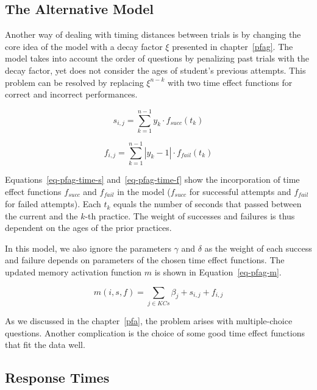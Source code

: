 \subsection{The Alternative Model}
\label{pfagt}

Another way of dealing with timing distances between trials is by changing the core idea of the model with a decay factor $\xi$ presented in chapter~\ref{pfag}. The model takes into account the order of questions by penalizing past trials with the decay factor, yet does not consider the ages of student's previous attempts. This problem can be resolved by replacing $\xi^{n-k}$ with two time effect functions for correct and incorrect performances.

\begin{equation} \label{eq-pfag-time-s}
  s_{i,j} = \sum_{k=1}^{n-1} y_k \cdot f_{\mathit{succ}}(t_k)
\end{equation}

\begin{equation} \label{eq-pfag-time-f}
  f_{i,j} = \sum_{k=1}^{n-1} |y_k - 1| \cdot f_{\mathit{fail}}(t_k)
\end{equation}

Equations~\ref{eq-pfag-time-s} and~\ref{eq-pfag-time-f} show the incorporation of time effect functions $f_{\mathit{succ}}$ and $f_{\mathit{fail}}$ in the model ($f_{\mathit{succ}}$ for successful attempts and $f_{\mathit{fail}}$ for failed attempts). Each $t_k$ equals the number of seconds that passed between the current and the $k$-th practice. The weight of successes and failures is thus dependent on the ages of the prior practices.

In this model, we also ignore the parameters $\gamma$ and $\delta$ as the weight of each success and failure depends on parameters of the chosen time effect functions. The updated memory activation function $m$ is shown in Equation~\ref{eq-pfag-m}.

\begin{equation} \label{eq-pfag-m}
  m(i,s,f) = \sum_{j \in KCs} \beta_j + s_{i,j} + f_{i,j} 
\end{equation}

As we discussed in the chapter~\ref{pfa}, the problem arises with multiple-choice questions. Another complication is the choice of some good time effect functions that fit the data well.

\subsection{Response Times}
\label{pfart}

